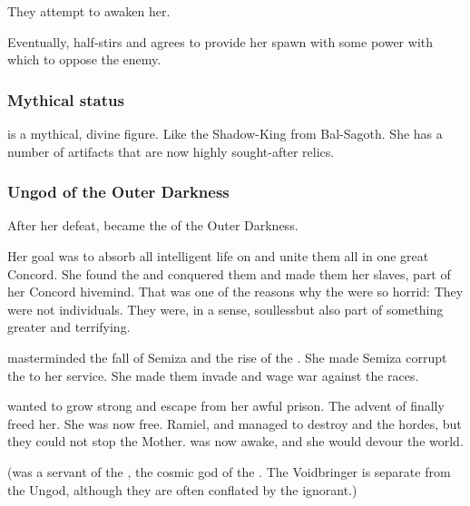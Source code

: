 They attempt to awaken her.

Eventually, \Tiamat{} half-stirs and agrees to provide her spawn with some power with which to oppose the enemy. 





\subsubsection{Mythical status}
\Tiamat{} is a mythical, divine figure. 
Like the Shadow-King from Bal-Sagoth. 
She has a number of artifacts that are now highly sought-after relics. 






\subsubsection{Ungod of the Outer Darkness}
%
After her defeat, \Tiamat became the  of the Outer Darkness. 

Her goal was to absorb all intelligent life on \Miith and unite them all in one great Concord. 
She found the \banes and conquered them and made them her slaves, part of her Concord hivemind. 
That was one of the reasons why the \banes were so horrid: 
They were not individuals. 
They were, in a sense, soulless\dash but also part of something greater and terrifying. 

\Tiamat masterminded the fall of Semiza and the rise of the \resphain.
She made Semiza corrupt the \resphain to her service. 
She made them invade \Miith and wage war against the \ophidian races. 

\Tiamat wanted to grow strong and escape from her awful prison. 
The advent of \Lithrim finally freed her. 
She was now free. 
Ramiel, \Azeraid and \Iscrafel managed to destroy \Daggerrain and the \bane hordes, but they could not stop the Mother. 
\Tiamat was now awake, and she would devour the world. 

(\Daggerrain was a servant of the , the cosmic god of the \banes. 
The Voidbringer is separate from the Ungod, although they are often conflated by the ignorant.)

